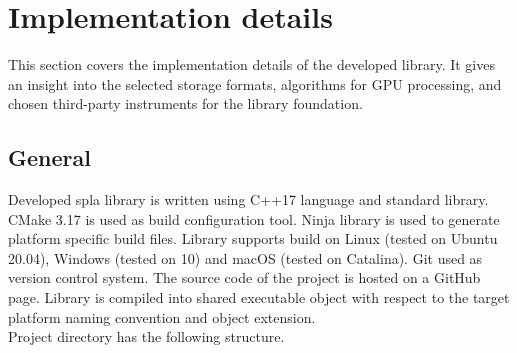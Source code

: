 \section{Implementation details}

This section covers the implementation details of the developed library. It gives an insight into the selected storage formats, algorithms for GPU processing, and chosen third-party instruments for the library foundation.

\subsection{General}

Developed spla library is written using C++17 language and standard library. CMake 3.17 is used as build configuration tool. Ninja library is used to generate platform specific build files. Library supports build on Linux (tested on Ubuntu 20.04), Windows (tested on 10) and macOS (tested on Catalina). Git used as version control system. The source code of the project is hosted on a GitHub page. Library is compiled into shared executable object with respect to the target platform naming convention and object extension.\\

Project directory has the following structure.\\

